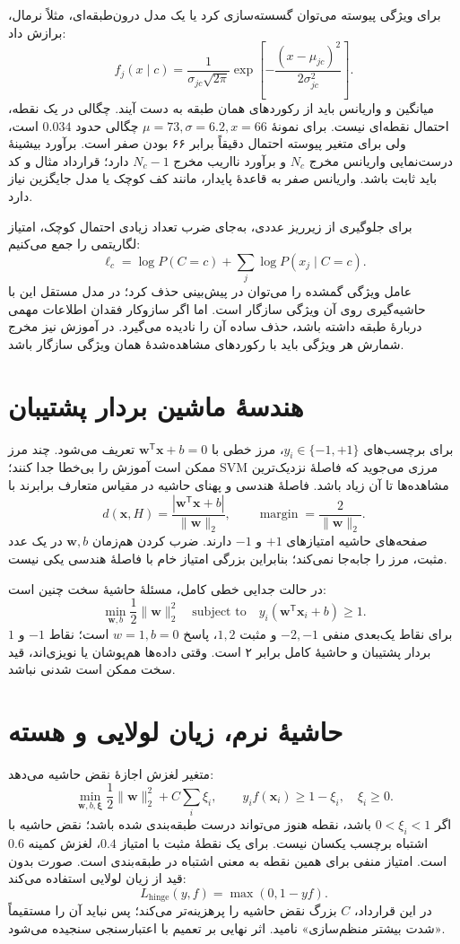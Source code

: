 برای ویژگی پیوسته می‌توان گسسته‌سازی کرد یا یک مدل درون‌طبقه‌ای، مثلاً نرمال، برازش داد:
\[f_j(x\mid c)=\frac1{\sigma_{jc}\sqrt{2\pi}}\exp\left[-\frac{(x-\mu_{jc})^2}{2\sigma_{jc}^2}\right].\]
میانگین و واریانس باید از رکوردهای همان طبقه به دست آیند. چگالی در یک نقطه، احتمال نقطه‌ای نیست. برای نمونهٔ $\mu=73,\sigma=6.2,x=66$ چگالی حدود $0.034$ است، ولی برای متغیر پیوسته احتمال دقیقاً برابر ۶۶ بودن صفر است. برآورد بیشینهٔ درست‌نمایی واریانس مخرج $N_c$ و برآورد نااریب مخرج $N_c-1$ دارد؛ قرارداد مثال و کد باید ثابت باشد. واریانس صفر به قاعدهٔ پایدار، مانند کف کوچک یا مدل جایگزین نیاز دارد.

برای جلوگیری از زیرریز عددی، به‌جای ضرب تعداد زیادی احتمال کوچک، امتیاز لگاریتمی را جمع می‌کنیم:
\[\ell_c=\log P(C=c)+\sum_j\log P(x_j\mid C=c).\]
عامل ویژگی گمشده را می‌توان در پیش‌بینی حذف کرد؛ در مدل مستقل این با حاشیه‌گیری روی آن ویژگی سازگار است. اما اگر سازوکار فقدان اطلاعات مهمی دربارهٔ طبقه داشته باشد، حذف ساده آن را نادیده می‌گیرد. در آموزش نیز مخرج شمارش هر ویژگی باید با رکوردهای مشاهده‌شدهٔ همان ویژگی سازگار باشد.

\section{هندسهٔ ماشین بردار پشتیبان}
برای برچسب‌های $y_i\in\{-1,+1\}$، مرز خطی با $\mathbf w^\mathsf T\mathbf x+b=0$ تعریف می‌شود. چند مرز ممکن است آموزش را بی‌خطا جدا کنند؛ SVM مرزی می‌جوید که فاصلهٔ نزدیک‌ترین مشاهده‌ها تا آن زیاد باشد. فاصلهٔ هندسی و پهنای حاشیه در مقیاس متعارف برابرند با
\[d(\mathbf x,H)=\frac{|\mathbf w^\mathsf T\mathbf x+b|}{\|\mathbf w\|_2},\qquad \operatorname{margin}=\frac2{\|\mathbf w\|_2}.\]
صفحه‌های حاشیه امتیازهای $+1$ و $-1$ دارند. ضرب کردن هم‌زمان $\mathbf w,b$ در یک عدد مثبت، مرز را جابه‌جا نمی‌کند؛ بنابراین بزرگی امتیاز خام با فاصلهٔ هندسی یکی نیست.

در حالت جدایی خطی کامل، مسئلهٔ حاشیهٔ سخت چنین است:
\[\min_{\mathbf w,b}\frac12\|\mathbf w\|_2^2\quad\text{subject to}\quad y_i(\mathbf w^\mathsf T\mathbf x_i+b)\ge1.\]
برای نقاط یک‌بعدی منفی $-2,-1$ و مثبت $1,2$، پاسخ $w=1,b=0$ است؛ نقاط $-1$ و $1$ بردار پشتیبان و حاشیهٔ کامل برابر ۲ است. وقتی داده‌ها هم‌پوشان یا نویزی‌اند، قید سخت ممکن است شدنی نباشد.

\section{حاشیهٔ نرم، زیان لولایی و هسته}
متغیر لغزش اجازهٔ نقض حاشیه می‌دهد:
\[\min_{\mathbf w,b,\boldsymbol\xi}\frac12\|\mathbf w\|_2^2+C\sum_i\xi_i,\qquad y_if(\mathbf x_i)\ge1-\xi_i,\quad\xi_i\ge0.\]
اگر $0<\xi_i<1$ باشد، نقطه هنوز می‌تواند درست طبقه‌بندی شده باشد؛ نقض حاشیه با اشتباه برچسب یکسان نیست. برای یک نقطهٔ مثبت با امتیاز $0.4$، لغزش کمینه $0.6$ است. امتیاز منفی برای همین نقطه به معنی اشتباه در طبقه‌بندی است. صورت بدون قید از زیان لولایی استفاده می‌کند:
\[L_{\mathrm{hinge}}(y,f)=\max(0,1-yf).\]
در این قرارداد، $C$ بزرگ نقض حاشیه را پرهزینه‌تر می‌کند؛ پس نباید آن را مستقیماً «شدت بیشتر منظم‌سازی» نامید. اثر نهایی بر تعمیم با اعتبارسنجی سنجیده می‌شود.

